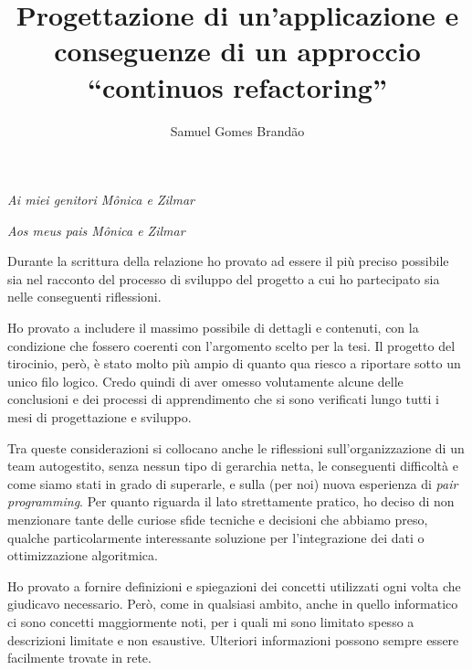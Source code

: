 \documentclass[12pt]{report}
\begin{document}
\renewcommand{\baselinestretch}{1.3}
\title{Progettazione di un'applicazione e conseguenze di un approccio
``continuos refactoring''}

\author{Samuel Gomes Brandão}

\beforepreface
{}
        {\hfill \Large {\sl Ai miei genitori Mônica e Zilmar}}

        {\hfill \Large {\sl Aos meus pais Mônica e Zilmar}}
% 
%

Durante la scrittura della relazione ho provato ad essere il più preciso 
possibile sia nel racconto del processo di sviluppo del progetto 
a cui ho partecipato sia nelle conseguenti riflessioni.

Ho provato a includere il massimo possibile di dettagli e contenuti, 
con la condizione che fossero coerenti con l'argomento scelto per 
la tesi. Il progetto del tirocinio, però, è stato molto più ampio di 
quanto qua riesco a riportare sotto un unico filo logico. 
Credo quindi di aver omesso volutamente alcune delle conclusioni e 
dei processi di apprendimento che si sono verificati lungo tutti 
i mesi di progettazione e sviluppo.

Tra queste considerazioni si collocano anche le riflessioni 
sull'organizzazione di 
un team autogestito, senza nessun tipo di gerarchia netta, le 
conseguenti difficoltà e come siamo stati in grado di superarle, 
e sulla (per noi) nuova esperienza di \textit{pair programming}. 
Per quanto riguarda il lato strettamente pratico, 
ho deciso di non menzionare tante delle curiose sfide
tecniche e decisioni che abbiamo preso, qualche particolarmente 
interessante soluzione per l'integrazione dei dati o 
ottimizzazione algoritmica.

Ho provato a fornire definizioni e spiegazioni dei concetti utilizzati ogni volta
che giudicavo necessario. Però, come in qualsiasi ambito, anche in quello informatico 
ci sono concetti maggiormente noti, per i quali mi sono limitato spesso a
descrizioni limitate e non esaustive. Ulteriori informazioni possono sempre
essere facilmente trovate in rete. 
\end{document}

